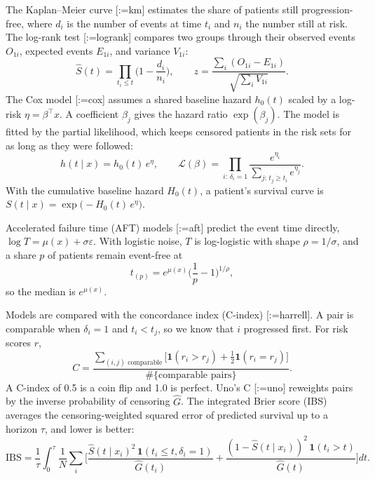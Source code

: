 \documentclass{mnnit}
\makeatletter
\newcommand{\rc}[1]{[\def\rc@sep{}\@for\rc@key:=#1\do{\rc@sep\ref{ref:\rc@key}\def\rc@sep{, }}]}
\makeatother
\begin{document}
The Kaplan--Meier curve \rc{km} estimates the share of patients still progression-free, where $d_i$ is the number of
events at time $t_i$ and $n_i$ the number still at risk. The log-rank test \rc{logrank} compares two groups through
their observed events $O_{1i}$, expected events $E_{1i}$, and variance $V_{1i}$:
\begin{equation}
  \hat S(t)=\prod_{t_i\le t}\Big(1-\frac{d_i}{n_i}\Big), \qquad
  z=\frac{\sum_i (O_{1i}-E_{1i})}{\sqrt{\sum_i V_{1i}}}.
\end{equation}
The Cox model \rc{cox} assumes a shared baseline hazard $h_0(t)$ scaled by a log-risk $\eta=\beta^\top x$. A
coefficient $\beta_j$ gives the hazard ratio $\exp(\beta_j)$. The model is fitted by the partial likelihood, which keeps
censored patients in the risk sets for as long as they were followed:
\begin{equation}
  h(t\mid x)=h_0(t)\,e^{\eta}, \qquad
  \mathcal{L}(\beta)=\prod_{i:\,\delta_i=1}\frac{e^{\eta_i}}{\sum_{j:\,t_j\ge t_i}e^{\eta_j}}.
\end{equation}
With the cumulative baseline hazard $H_0(t)$, a patient's survival curve is $S(t\mid x)=\exp\big(-H_0(t)\,e^{\eta}\big)$.

Accelerated failure time (AFT) models \rc{aft} predict the event time directly, $\log T=\mu(x)+\sigma\varepsilon$. With
logistic noise, $T$ is log-logistic with shape $\rho=1/\sigma$, and a share $p$ of patients remain event-free at
\begin{equation}
  t_{(p)}=e^{\mu(x)}\Big(\frac{1}{p}-1\Big)^{1/\rho},
\end{equation}
so the median is $e^{\mu(x)}$.

Models are compared with the concordance index (C-index) \rc{harrell}. A pair is comparable when $\delta_i=1$ and
$t_i<t_j$, so we know that $i$ progressed first. For risk scores $r$,
\begin{equation}
  C=\frac{\sum_{(i,j)\text{ comparable}}\big[\mathbf{1}(r_i>r_j)+\tfrac12\mathbf{1}(r_i=r_j)\big]}{\#\{\text{comparable pairs}\}}.
\end{equation}
A C-index of 0.5 is a coin flip and 1.0 is perfect. Uno's C \rc{uno} reweights pairs by the inverse probability of
censoring $\hat G$. The integrated Brier score (IBS) averages the censoring-weighted squared error of predicted survival
up to a horizon $\tau$, and lower is better:
\begin{equation}
  \mathrm{IBS}=\frac{1}{\tau}\int_0^{\tau}\frac1N\sum_i\Big[\frac{\hat S(t\mid x_i)^2\,\mathbf{1}(t_i\le t,\delta_i=1)}{\hat G(t_i)}+\frac{(1-\hat S(t\mid x_i))^2\,\mathbf{1}(t_i>t)}{\hat G(t)}\Big]dt.
\end{equation}
\end{document}
